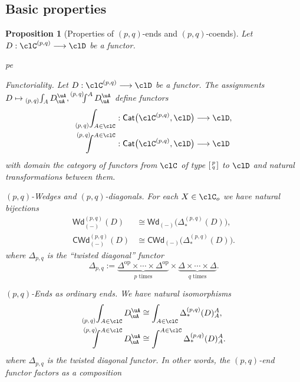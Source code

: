 \documentclass[11pt]{amsart}
\def\defeq{:=}
\newcommand*{\Scale}[2][4]{\scalebox{#1}{\ensuremath{#2}}}%
\newcommand{\pqMat}[1]{
  {\Scale[.925]{\begin{smallmatrix}
    #1 %
    \end{smallmatrix}}}
}\newcommand{\typepq}[2]{\left[\pqMat{#1\\#2}\right]}
\def\Wd{\mathsf{Wd}}
\def\CWd{\mathsf{CWd}}
\newcommand{\Wedges}[2]{\mathsf{Wd}_{#1}\big(#2\big)}
\newcommand{\Cowedges}[2]{\mathsf{CWd}_{#1}\big(#2\big)}
\newcommand{\pqdiag}{\Delta_{p,q}}
\newcommand{\pqWedges}[4]{\Wd^{(#1,#2)}_{#3}(#4)}
\newcommand{\pqCoWedges}[4]{\CWd^{(#1,#2)}_{#3}(#4)}
\newcommand{\pqEnd}[3]{\mathop{\prescript{}{\Scale[.75]{\raisebox{.25em}{$(#1,#2)$}}}{\int_{#3}}}}
\newcommand{\pqCoend}[3]{%
  \mathchoice
    {\mathop{\prescript{\Scale[.75]{\raisebox{-.25em}{$(#1,#2)$}}\kern-.625em}{}{\int^{#3}}}}
    {\mathop{\prescript{\Scale[.75]{\raisebox{-.25em}{$(#1,#2)$}}\kern-.25em}{}{\int^{#3}}}}
    {\mathop{\prescript{\Scale[.75]{\raisebox{-.25em}{$(#1,#2)$}}\kern-.25em}{}{\int^{#3}}}}
    {\mathop{\prescript{\Scale[.75]{\raisebox{-.25em}{$(#1,#2)$}}\kern-.25em}{}{\int^{#3}}}}
  }
\newcommand{\SloganFont}[1]{{\textit{#1. }}}
\def\Cat{\mathsf{Cat}}
\newtheorem{proposition}{Proposition}
\def\op{\text{op}}
\begin{document}
\subsection{Basic properties}
\begin{proposition}[Properties of $(p,q)$-ends and $(p,q)$-coends]\label{prop:properties-of-p-q-ends}
	Let $D :\pq{\clC}\longrightarrow\clD$ be a functor.
	\begin{enumtag}{pe}
		\item\label{functoriality-of-p-q-ends}\SloganFont{Functoriality}Let $D :\pq{\clC}\longrightarrow\clD$ be a functor. The assignments $D\mapsto\pqEnd{p}{q}{A}D^{\uA}_{\!\uA},\pqCoend{p}{q}{A}D^{\uA}_{\!\uA}$ define functors
		\begin{align*}
			\pqEnd{p}{q}{A\in\clC}   & : \Cat\big(\pq{\clC},\clD\big) \longrightarrow\clD, \\
			\pqCoend{p}{q}{A\in\clC} & : \Cat\big(\pq{\clC},\clD\big) \longrightarrow\clD
		\end{align*}
		with domain the category of functors from $\clC$ of type $\left[\pqMat{p\\q}\right]$ to $\clD$ and natural transformations between them.
		\item\label{p-q-wedges-and-p-q-diagonals}\SloganFont{$(p,q)$-Wedges and $(p,q)$-diagonals}For each $X\in\clC_o$ we have natural bijections
		\begin{align*}
			\pqWedges{p}{q}{(-)}{D}   & \cong   \Wedges{(-)}{\Delta^{(p,q)}_{*}(D)}, \\
			\pqCoWedges{p}{q}{(-)}{D} & \cong \Cowedges{(-)}{\Delta^{(p,q)}_{*}(D)}.
		\end{align*}
		where $\pqdiag$ is the ``twisted diagonal'' functor%
		\[\pqdiag\defeq\underbrace{\Delta^{\op}\times\cdots\times\Delta^{\op}}_{\text{$p$ times}}\times\underbrace{\Delta\times\cdots\times\Delta}_{\text{$q$ times}}.\]
		\item\label{p-q-ends-as-ordinary-ends}\SloganFont{$(p,q)$-Ends as ordinary ends}We have natural isomorphisms
		\begin{align*}
			\pqEnd{p}{q}{A\in\clC}D^{\uA}_{\!\uA}   & \cong \int_{A\in\clC}\Delta^{(p,q)}_{*}(D)^{A}_{A}, \\
			\pqCoend{p}{q}{A\in\clC}D^{\uA}_{\!\uA} & \cong \int^{A\in\clC}\Delta^{(p,q)}_{*}(D)^{A}_{A}.
		\end{align*}
		where $\pqdiag$ is the twisted diagonal functor.%
		In other words, the $(p,q)$-end functor factors as a composition

\end{enumtag}
\end{proposition}
\end{document}
